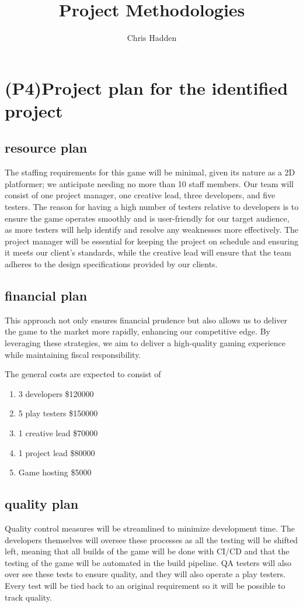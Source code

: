 \documentclass{article}
\title{Project Methodologies}
\author{Chris Hadden}
\begin{document}
\maketitle
\tableofcontents
\break

\section{(P4)Project plan for the identified project }

\subsection{resource plan}
The staffing requirements for this game will be minimal, given its nature as a 2D platformer; we anticipate needing no more than 10 staff members. Our team will consist of one project manager, one creative lead, three developers, and five testers. The reason for having a high number of testers relative to developers is to ensure the game operates smoothly and is user-friendly for our target audience, as more testers will help identify and resolve any weaknesses more effectively. The project manager will be essential for keeping the project on schedule and ensuring it meets our client's standards, while the creative lead will ensure that the team adheres to the design specifications provided by our clients.

\subsection{financial plan}
This approach not only ensures financial prudence but also allows us to deliver the game to the market more rapidly, enhancing our competitive edge. By leveraging these strategies, we aim to deliver a high-quality gaming experience while maintaining fiscal responsibility.

The general costs are expected to consist of
\begin{enumerate}
    \item 3 developers \$120000
    \item 5 play testers \$150000
    \item 1 creative lead \$70000
    \item 1 project lead \$80000
    \item Game hosting \$5000
\end{enumerate}

\subsection{quality plan}
Quality control measures will be streamlined to minimize development time. The developers themselves will oversee these processes as all the testing will be shifted left, meaning that all builds of the game will be done with CI/CD and that the testing of the game will be automated in the build pipeline. QA testers will also over see these tests to ensure quality, and they will also operate a play testers.
Every test will be tied back to an original requirement so it will be possible to track quality.
\end{document}
